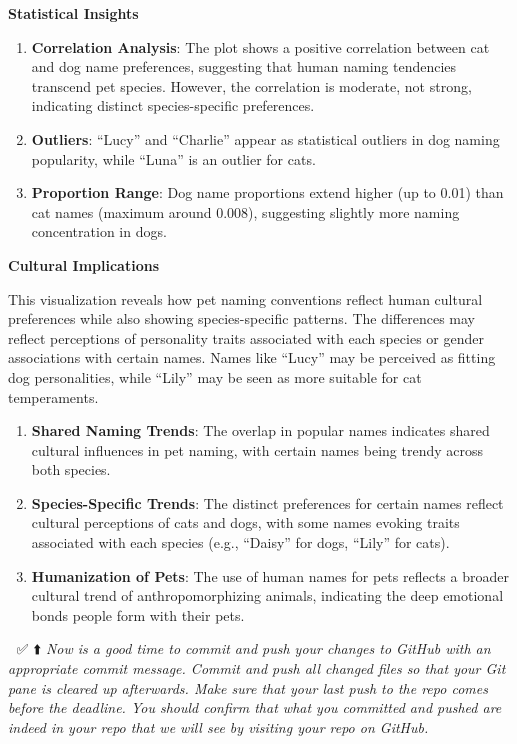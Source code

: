 \documentclass[
]{article}
\providecommand{\tightlist}{%
  \setlength{\itemsep}{0pt}\setlength{\parskip}{0pt}}
\begin{document}
\textbf{Statistical Insights}

\begin{enumerate}
\def\labelenumi{\arabic{enumi}.}
\item
  \textbf{Correlation Analysis}: The plot shows a positive correlation
  between cat and dog name preferences, suggesting that human naming
  tendencies transcend pet species. However, the correlation is
  moderate, not strong, indicating distinct species-specific
  preferences.
\item
  \textbf{Outliers}: ``Lucy'' and ``Charlie'' appear as statistical
  outliers in dog naming popularity, while ``Luna'' is an outlier for
  cats.
\item
  \textbf{Proportion Range}: Dog name proportions extend higher (up to
  0.01) than cat names (maximum around 0.008), suggesting slightly more
  naming concentration in dogs.
\end{enumerate}

\textbf{Cultural Implications}

This visualization reveals how pet naming conventions reflect human
cultural preferences while also showing species-specific patterns. The
differences may reflect perceptions of personality traits associated
with each species or gender associations with certain names. Names like
``Lucy'' may be perceived as fitting dog personalities, while ``Lily''
may be seen as more suitable for cat temperaments.

\begin{enumerate}
\def\labelenumi{\arabic{enumi}.}
\tightlist
\item
  \textbf{Shared Naming Trends}: The overlap in popular names indicates
  shared cultural influences in pet naming, with certain names being
  trendy across both species.
\item
  \textbf{Species-Specific Trends}: The distinct preferences for certain
  names reflect cultural perceptions of cats and dogs, with some names
  evoking traits associated with each species (e.g., ``Daisy'' for dogs,
  ``Lily'' for cats).
\item
  \textbf{Humanization of Pets}: The use of human names for pets
  reflects a broader cultural trend of anthropomorphizing animals,
  indicating the deep emotional bonds people form with their pets.
\end{enumerate}

🧶 ✅ ⬆️ \emph{Now is a good time to commit and push your changes to
GitHub with an appropriate commit message. Commit and push all changed
files so that your Git pane is cleared up afterwards. Make sure that
your last push to the repo comes before the deadline. You should confirm
that what you committed and pushed are indeed in your repo that we will
see by visiting your repo on GitHub.}
\end{document}

